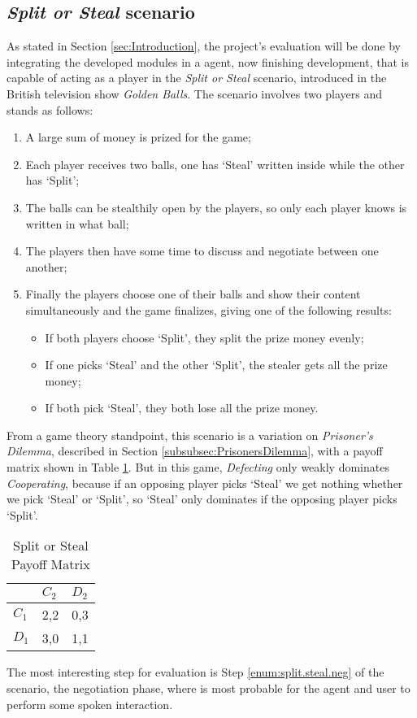 \subsection{\textit{Split or Steal} scenario}
As stated in Section \ref{sec:Introduction}, the project's evaluation will be done by integrating the developed modules in a agent, now finishing development, that is capable of acting as a player in the \textit{Split or Steal} scenario, introduced in the British television show \textit{Golden Balls}\cite{Wikipedia.Golden.Balls}. The scenario involves two players and stands as follows:
\begin{enumerate}
	\item A large sum of money is prized for the game;
	\item Each player receives two balls, one has `Steal' written inside while the other has `Split';
	\item The balls can be stealthily open by the players, so only each player knows is written in what ball;
	\item \label{enum:split.steal.neg}The players then have some time to discuss and negotiate between one another;
	\item Finally the players choose one of their balls and show their content simultaneously and the game finalizes, giving one of the following results:
	\begin{itemize}
		\item If both players choose `Split', they split the prize money evenly;
		\item If one picks `Steal' and the other `Split', the stealer gets all the prize money;
		\item If both pick `Steal', they both lose all the prize money.
	\end{itemize}	
\end{enumerate}

From a game theory standpoint, this scenario is a variation on \textit{Prisoner's Dilemma}, described in Section \ref{subsubsec:PrisonersDilemma}, with a payoff matrix shown in Table \ref{tbl:SplitStealPayoffMatrix}. But in this game, \textit{Defecting} only weakly dominates \textit{Cooperating}, because if an opposing player picks `Steal' we get nothing whether we pick `Steal' or `Split', so `Steal' only dominates if the opposing player picks `Split'\cite{Rapoport1988}.

\begin{table}[]
	\centering
	\begin{tabular}{l|l|l|}
		\cline{2-3}
		& $C_2$   & $D_2$   \\ \hline
		\multicolumn{1}{|l|}{$C_1$} & 2,2 & 0,3 \\ \hline
		\multicolumn{1}{|l|}{$D_1$} & 3,0 & 1,1 \\ \hline
	\end{tabular}
	\caption{Split or Steal Payoff Matrix}
	\label{tbl:SplitStealPayoffMatrix}
\end{table}	

The most interesting step for evaluation is Step \ref{enum:split.steal.neg} of the scenario, the negotiation phase, where is most probable for the agent and user to perform some spoken interaction.